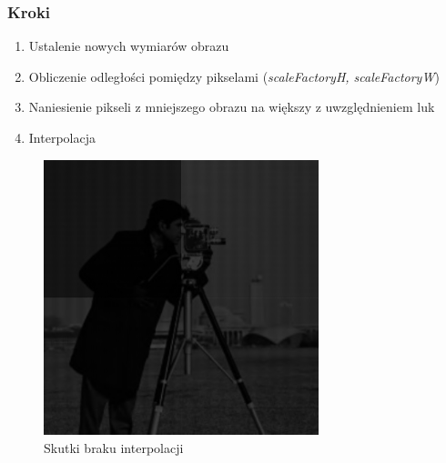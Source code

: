 \documentclass[a4paper,12pt]{book}
\begin{document}
\subsubsection*{Kroki}
\begin{enumerate}
	\item Ustalenie nowych wymiarów obrazu
	\item Obliczenie odległości pomiędzy pikselami (\textit{scaleFactoryH, scaleFactoryW})
	\item Naniesienie pikseli z mniejszego obrazu na większy z uwzględnieniem luk
	\item Interpolacja
\end{enumerate}
\begin{figure}
	\caption{Skutki braku interpolacji}
	\begin{center}
		\includegraphics[width=8cm, height=8cm]{man-without-interpolation.png}
	\end{center}
\end{figure}
\end{document}
